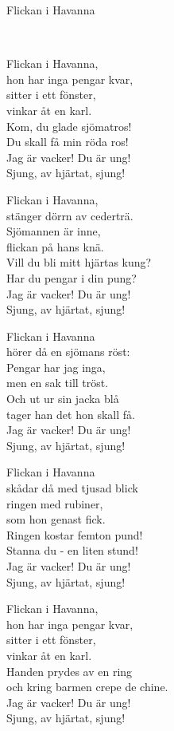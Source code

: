 \begin{song}{Flickan i Havanna}
	
	
	\\

    \showversenumber	
	Flickan i Havanna,\\
	hon har inga pengar kvar,\\
	sitter i ett fönster,\\
	vinkar åt en karl.\\
	Kom, du glade sjömatros!\\
	Du skall få min röda ros!\\
	Jag är vacker! Du är ung!\\
	Sjung, av hjärtat, sjung!
	
    \showversenumber
	Flickan i Havanna,\\
	stänger dörrn av cederträ.\\
	Sjömannen är inne,\\
	flickan på hans knä.\\
	Vill du bli mitt hjärtas kung?\\
	Har du pengar i din pung?\\
	Jag är vacker! Du är ung!\\
	Sjung, av hjärtat, sjung!
	
    \showversenumber
	Flickan i Havanna\\
	hörer då en sjömans röst:\\
	Pengar har jag inga,\\
	men en sak till tröst.\\
	Och ut ur sin jacka blå\\
	tager han det hon skall få.\\
	Jag är vacker! Du är ung!\\
	Sjung, av hjärtat, sjung!
	
    \showversenumber
	Flickan i Havanna\\
	skådar då med tjusad blick\\
	ringen med rubiner,\\
	som hon genast fick.\\
	Ringen kostar femton pund!\\
	Stanna du - en liten stund!\\
	Jag är vacker! Du är ung!\\
	Sjung, av hjärtat, sjung!
	
    \showversenumber
	Flickan i Havanna,\\
	hon har inga pengar kvar,\\
	sitter i ett fönster,\\
	vinkar åt en karl.\\
	Handen prydes av en ring\\
	och kring barmen crepe de chine.\\
	Jag är vacker! Du är ung!\\
	Sjung, av hjärtat, sjung!
	
\end{song}
